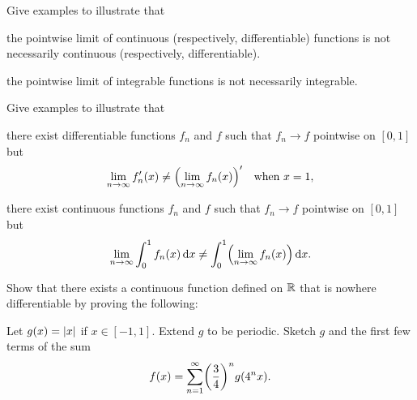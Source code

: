 \documentclass{../homework}
\begin{document}
\begin{problems}
\item Give examples to illustrate that
  \begin{problems}
  \item the pointwise limit of continuous (respectively,
    differentiable) functions is not necessarily continuous
    (respectively, differentiable).

    \begin{solution}
    \end{solution}

  \item the pointwise limit of integrable functions is not necessarily
    integrable.

    \begin{solution}
    \end{solution}
  \end{problems}

\item Give examples to illustrate that
  \begin{problems}
  \item there exist differentiable functions \(f_n\) and \(f\) such
    that \(f_n \to f\) pointwise on \([0, 1]\) but
    \[
      \lim_{n\to\infty} f_n'(x) \ne \prn*{\lim_{n\to\infty} f_n(x)}'
      \quad \text{when \(x=1\)},
    \]

    \begin{solution}
    \end{solution}

  \item there exist continuous functions \(f_n\) and \(f\) such that
    \(f_n \to f\) pointwise on \([0, 1]\) but
    \[
      \lim_{n\to\infty} \int_0^1 f_n(x) \dif x
      \ne \int_0^1 \prn*{\lim_{n\to\infty} f_n(x)} \dif x.
    \]

    \begin{solution}
    \end{solution}
  \end{problems}

\item Show that there exists a continuous function defined on \(\mathbb R\)
  that is nowhere differentiable by proving the following:
  \begin{problems}
  \item Let \(g(x) = \lvert x\rvert\) if \(x \in [-1, 1]\).  Extend \(g\) to
    be periodic.  Sketch \(g\) and the first few terms of the sum
    \[
      f(x) = \sum_{n=1}^\infty \prn*{\frac 3 4}^n g(4^n x).
    \]

    \begin{solution}
    \end{solution}


\end{problems}
\end{problems}
\end{document}

